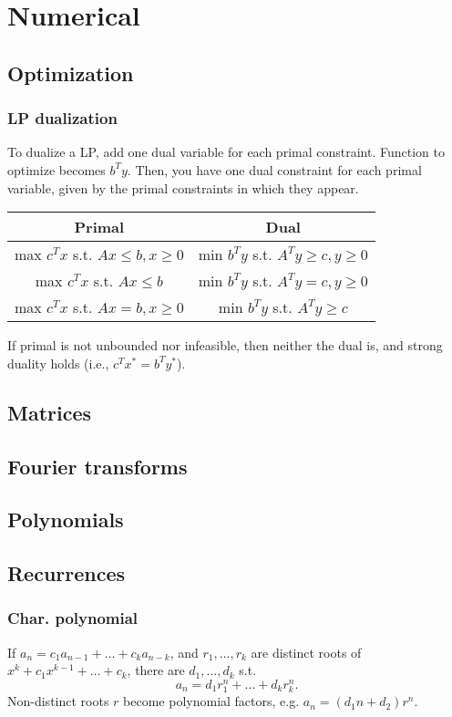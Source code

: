 \chapter{Numerical}
  
\section{Optimization}
	
	\subsection{LP dualization}
	To dualize a LP, add one dual variable for each primal 
	constraint. Function to optimize becomes $b^T y$. 
	Then, you have one dual constraint for each primal variable, 
	given by the primal constraints in which they appear. 
	\begin{center}
		\begin{tabular}{ |c|c| } 
		 \hline
		 \textbf{Primal} & \textbf{Dual} \\
		 \hline
		 max $c^T x$ s.t. $Ax \leq b, x \geq 0$ & min $b^T y$ s.t. $A^T y \geq c, y \geq 0$ \\ 
		 max $c^T x$ s.t. $Ax \leq b$ & min $b^T y$ s.t. $A^T y = c, y \geq 0$ \\ 
		 max $c^T x$ s.t. $Ax = b, x \geq 0$ & min $b^T y$ s.t. $A^T y \geq c$ \\ 
		 \hline
		\end{tabular}
	\end{center}
	If primal is not unbounded nor infeasible, then neither the
	dual is, and strong duality holds (i.e., $c^T x^* = b^T y^*$).

\section{Matrices}


\section{Fourier transforms}


\section{Polynomials}

\section{Recurrences}
	\subsection{Char. polynomial}
	If $a_n = c_1 a_{n-1} + \dots + c_k a_{n-k}$, and $r_1, \dots, r_k$ are distinct roots of $x^k + c_1 x^{k-1} + \dots + c_k$, there are $d_1, \dots, d_k$ s.t.
	\[a_n = d_1r_1^n + \dots + d_kr_k^n. \]
	Non-distinct roots $r$ become polynomial factors, e.g. $a_n = (d_1n + d_2)r^n$.
